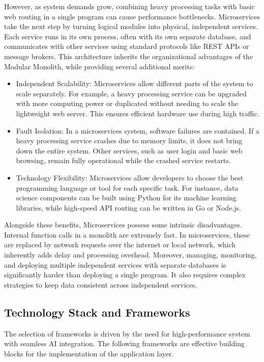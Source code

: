 However, as system demands grow, combining heavy processing tasks with basic web routing in a single program can cause performance bottlenecks. 
Microservices take the next step by turning logical modules into physical, independent services. Each service runs in its own process, 
often with its own separate database, and communicates with other services using standard protocols like REST APIs or message brokers.
This architecture inherits the organizational advantages of the Modular Monolith, while providing several additional merits:
\begin{itemize}
    \item {Independent Scalability:} Microservices allow different parts of the system to scale separately. For example, a heavy processing service can be upgraded with more computing power or duplicated without needing to scale the lightweight web server. This ensures efficient hardware use during high traffic.
    
    \item {Fault Isolation:} In a microservices system, software failures are contained. If a heavy processing service crashes due to memory limits, it does not bring down the entire system. Other services, such as user login and basic web browsing, remain fully operational while the crashed service restarts.
    
    \item {Technology Flexibility:} Microservices allow developers to choose the best programming language or tool for each specific task. For instance, data science components can be built using Python for its machine learning libraries, while high-speed API routing can be written in Go or Node.js.
\end{itemize}

Alongside these benefits, Microservices possess some intrinsic disadvantages. Internal function calls in a monolith are extremely fast. In microservices, these are replaced by network requests over the internet or local network, which inherently adds delay and processing overhead.
Moreover, managing, monitoring, and deploying multiple independent services with separate databases is significantly harder than 
deploying a single program. It also requires complex strategies to keep data consistent across independent services.


\subsection{Technology Stack and Frameworks}
The selection of frameworks is driven by the need for high-performance system with seamless AI integration. The following frameworks are  
effective building blocks for the implementation of the application layer.
